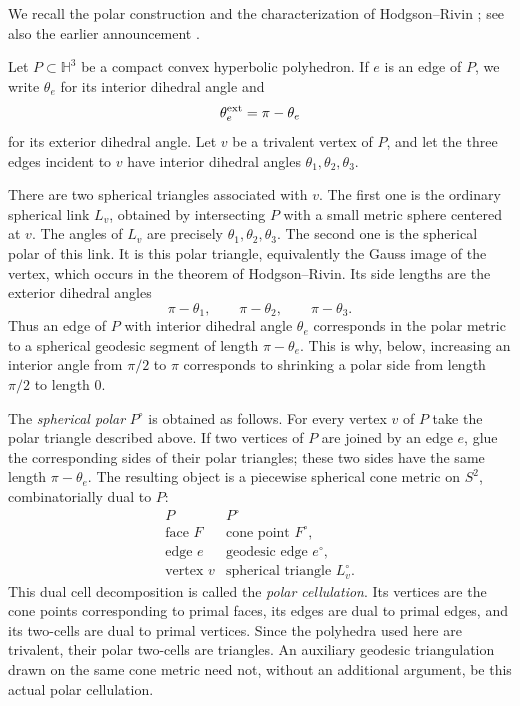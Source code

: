 \documentclass[12pt,a4paper]{article}
\theoremstyle{definition}
\newcommand{\HH}{\mathbb H}
\begin{document}
We recall the polar construction and the characterization of
Hodgson--Rivin \cite[Theorem~1.1]{RivinHodgson1993}; see also the earlier
announcement \cite[Theorem~5]{HodgsonRivinSmith}.

Let \(P\subset \HH^3\) be a compact convex hyperbolic polyhedron.  If \(e\) is an
edge of \(P\), we write \(\theta_e\) for its interior dihedral angle and
\[
        \theta_e^{\rm ext}=\pi-\theta_e
\]
for its exterior dihedral angle.  Let \(v\) be a trivalent vertex of \(P\), and
let the three edges incident to \(v\) have interior dihedral angles
\(\theta_1,\theta_2,\theta_3\).

There are two spherical triangles associated with \(v\).  The first one is the
ordinary spherical link \(L_v\), obtained by intersecting \(P\) with a small metric
sphere centered at \(v\).  The angles of \(L_v\) are precisely
\(\theta_1,\theta_2,\theta_3\).  The second one is the spherical polar of this
link.  It is this polar triangle, equivalently the Gauss image of the vertex,
which occurs in the theorem of Hodgson--Rivin.  Its side lengths are the
exterior dihedral angles
\begin{equation}\label{eq:polar-triangle-sides}
        \pi-\theta_1,\qquad \pi-\theta_2,\qquad \pi-\theta_3 .
\end{equation}
Thus an edge of \(P\) with interior dihedral angle \(\theta_e\) corresponds in the
polar metric to a spherical geodesic segment of length \(\pi-\theta_e\).  This is
why, below, increasing an interior angle from \(\pi/2\) to \(\pi\) corresponds to
shrinking a polar side from length \(\pi/2\) to length \(0\).

The \emph{spherical polar} \(P^\circ\) is obtained as follows.  For every vertex
\(v\) of \(P\) take the polar triangle described above.  If two vertices of \(P\)
are joined by an edge \(e\), glue the corresponding sides of their polar triangles;
these two sides have the same length \(\pi-\theta_e\).  The resulting object is a
piecewise spherical cone metric on \(S^2\), combinatorially dual to \(P\):
\[
\begin{array}{c|c}
P & P^\circ \\
\hline
\text{face }F & \text{cone point }F^\circ,\\
\text{edge }e & \text{geodesic edge }e^\circ,\\
\text{vertex }v & \text{spherical triangle }L_v^\circ.
\end{array}
\]
This dual cell decomposition is called the \emph{polar cellulation}.  Its
vertices are the cone points corresponding to primal faces, its edges are
dual to primal edges, and its two-cells are dual to primal vertices.  Since
the polyhedra used here are trivalent, their polar two-cells are triangles.
An auxiliary geodesic triangulation drawn on the same cone metric need not,
without an additional argument, be this actual polar cellulation.
\end{document}
